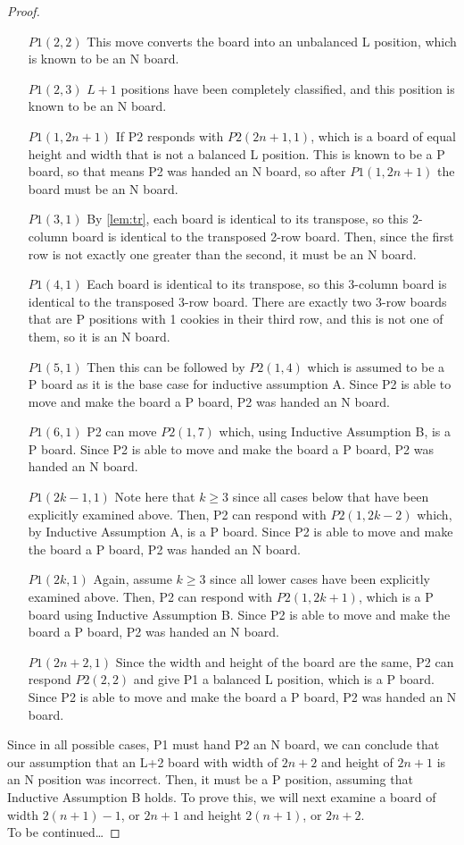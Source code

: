 \documentclass{amsart}
\theoremstyle{definition}
\theoremstyle{remark}
\numberwithin{equation}{section}
\begin{document}
\begin{proof}
\begin{itemize}
	\item [$P1(2,2)$] This move converts the board into an unbalanced L position, which is known to be an N board.
	\item [$P1(2, 3)$] $L+1$ positions have been completely classified, and this position is known to be an N board.
	\item [$P1(1, 2n+1)$] If P2 responds with $P2(2n+1, 1)$, which is a board of equal height and width that is not a balanced L position.  This is known to be a P board, so that means P2 was handed an N board, so after $P1(1, 2n+1)$ the board must be an N board.
	\item [$P1(3, 1)$] By \ref{lem:tr}, each board is identical to its transpose, so this 2-column board is identical to the transposed 2-row board.  Then, since the first row is not exactly one greater than the second, it must be an N board.
	\item[$P1(4,1)$] Each board is identical to its transpose, so this 3-column board is identical to the transposed 3-row board.  There are exactly two 3-row boards that are P positions with 1 cookies in their third row, and this is not one of them, so it is an N board.
	\item[$P1(5, 1)$] Then this can be followed by $P2(1,4)$ which is assumed to be a P board as it is the base case for inductive assumption A.  Since P2 is able to move and make the board a P board, P2 was handed an N board.
	\item [$P1(6,1)$] P2 can move $P2(1,7)$ which, using Inductive Assumption B, is a P board.  Since P2 is able to move and make the board a P board, P2 was handed an N board.
	\item [$P1(2k-1, 1)$] Note here that $k\geq 3$ since all cases below that have been explicitly examined above.  Then, P2 can respond with $P2(1, 2k-2)$ which, by Inductive Assumption A, is a P board.  Since P2 is able to move and make the board a P board, P2 was handed an N board.
	\item [$P1(2k, 1)$] Again, assume $k\geq 3$ since all lower cases have been explicitly examined above.  Then, P2 can respond with $P2(1,2k+1)$, which is a P board using Inductive Assumption B.  Since P2 is able to move and make the board a P board, P2 was handed an N board.
	\item [$P1(2n+2, 1)$] Since the width and height of the board are the same, P2 can respond $P2(2, 2)$ and give P1 a balanced L position, which is a P board.  Since P2 is able to move and make the board a P board, P2 was handed an N board.
\end{itemize}
	Since in all possible cases, P1 must hand P2 an N board, we can conclude that our assumption that an L+2 board with width of $2n+2$ and height of $2n+1$ is an N position was incorrect.  Then, it must be a P position, assuming that Inductive Assumption B holds.  To prove this, we will next examine a board of width $2(n+1)-1$, or $2n+1$ and height $2(n+1)$, or $2n+2$.\\
	To be continued\dots

\end{proof}
\end{document}
